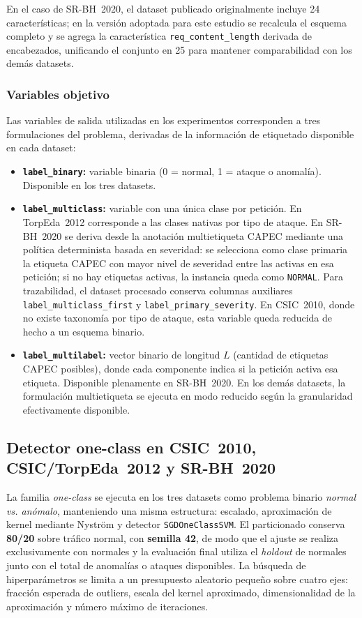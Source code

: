 \documentclass[12pt,oneside]{report}
\begin{document}
En el caso de SR-BH~2020, el dataset publicado originalmente incluye 24 características; en la versión adoptada para este estudio se recalcula el esquema completo y se agrega la característica \texttt{req\_content\_length} derivada de encabezados, unificando el conjunto en 25 para mantener comparabilidad con los demás datasets.

\subsubsection{Variables objetivo}
Las variables de salida utilizadas en los experimentos corresponden a tres formulaciones del problema, derivadas de la información de etiquetado disponible en cada dataset:

\begin{itemize}[leftmargin=*]
  \item \textbf{\texttt{label\_binary}:} variable binaria (0 = normal, 1 = ataque o anomalía). Disponible en los tres datasets.
  \item \textbf{\texttt{label\_multiclass}:} variable con una única clase por petición. En TorpEda~2012 corresponde a las clases nativas por tipo de ataque. En SR-BH~2020 se deriva desde la anotación multietiqueta CAPEC mediante una política determinista basada en severidad: se selecciona como clase primaria la etiqueta CAPEC con mayor nivel de severidad entre las activas en esa petición; si no hay etiquetas activas, la instancia queda como \texttt{NORMAL}. Para trazabilidad, el dataset procesado conserva columnas auxiliares \texttt{label\_multiclass\_first} y \texttt{label\_primary\_severity}. En CSIC~2010, donde no existe taxonomía por tipo de ataque, esta variable queda reducida de hecho a un esquema binario.
  \item \textbf{\texttt{label\_multilabel}:} vector binario de longitud $L$ (cantidad de etiquetas CAPEC posibles), donde cada componente indica si la petición activa esa etiqueta. Disponible plenamente en SR-BH~2020. En los demás datasets, la formulación multietiqueta se ejecuta en modo reducido según la granularidad efectivamente disponible.
\end{itemize}

\subsection{Detector one-class en CSIC~2010, CSIC/TorpEda~2012 y SR-BH~2020}
La familia \textit{one-class} se ejecuta en los tres datasets como problema binario \textit{normal vs. anómalo}, manteniendo una misma estructura: escalado, aproximación de kernel mediante Nyström y detector \texttt{SGDOneClassSVM}. El particionado conserva \textbf{80/20} sobre tráfico normal, con \textbf{semilla 42}, de modo que el ajuste se realiza exclusivamente con normales y la evaluación final utiliza el \textit{holdout} de normales junto con el total de anomalías o ataques disponibles. La búsqueda de hiperparámetros se limita a un presupuesto aleatorio pequeño sobre cuatro ejes: fracción esperada de outliers, escala del kernel aproximado, dimensionalidad de la aproximación y número máximo de iteraciones.
\end{document}
